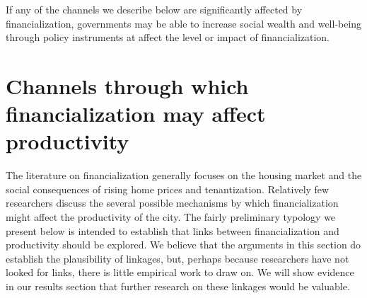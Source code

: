 If any of the channels we describe below are significantly affected by financialization, governments may be able to increase social wealth and well-being through policy instruments at affect the level or impact of financialization. 










\section{Channels through which financialization may affect productivity}
The literature on financialization generally focuses on the housing market and the social consequences of rising home prices and tenantization.  Relatively few researchers discuss the several possible mechanisms by which financialization might affect the productivity of the city. The fairly preliminary typology we present below is intended to establish that links between financialization and productivity should be explored. We believe that the arguments in this section do establish the plausibility of linkages, but, perhaps because researchers have not looked for links, there is little empirical work to draw on. We will show evidence in our results section that further research on these linkages would be valuable.

